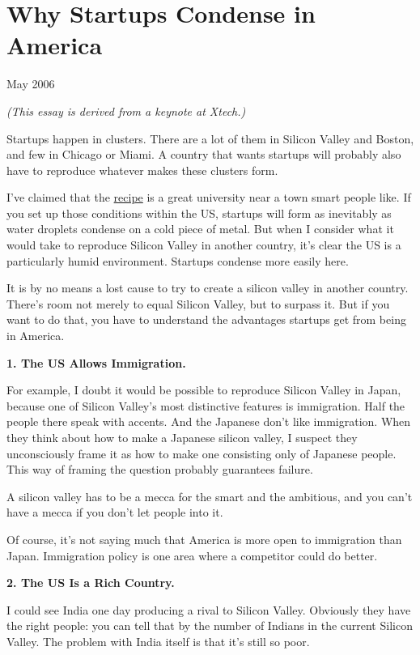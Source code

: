 \chapter{Why Startups Condense in America}

May 2006

\emph{(This essay is derived from a keynote at Xtech.)}

Startups happen in clusters. There are a lot of them in Silicon Valley
and Boston, and few in Chicago or Miami. A country that wants startups
will probably also have to reproduce whatever makes these clusters form.

I've claimed that the \href{siliconvalley.html}{recipe} is a great
university near a town smart people like. If you set up those conditions
within the US, startups will form as inevitably as water droplets
condense on a cold piece of metal. But when I consider what it would
take to reproduce Silicon Valley in another country, it's clear the US
is a particularly humid environment. Startups condense more easily here.

It is by no means a lost cause to try to create a silicon valley in
another country. There's room not merely to equal Silicon Valley, but to
surpass it. But if you want to do that, you have to understand the
advantages startups get from being in America.

\textbf{1. The US Allows Immigration.}

For example, I doubt it would be possible to reproduce Silicon Valley in
Japan, because one of Silicon Valley's most distinctive features is
immigration. Half the people there speak with accents. And the Japanese
don't like immigration. When they think about how to make a Japanese
silicon valley, I suspect they unconsciously frame it as how to make one
consisting only of Japanese people. This way of framing the question
probably guarantees failure.

A silicon valley has to be a mecca for the smart and the ambitious, and
you can't have a mecca if you don't let people into it.

Of course, it's not saying much that America is more open to immigration
than Japan. Immigration policy is one area where a competitor could do
better.

\textbf{2. The US Is a Rich Country.}

I could see India one day producing a rival to Silicon Valley. Obviously
they have the right people: you can tell that by the number of Indians
in the current Silicon Valley. The problem with India itself is that
it's still so poor.

